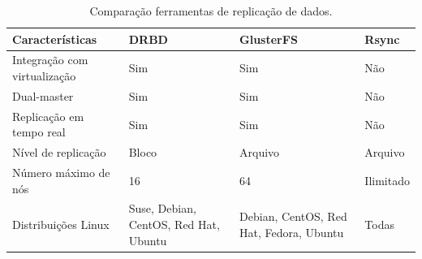 
\begin{table}[h!]
\caption{Comparação ferramentas de replicação de dados.}
\label{tab:replicacao}
\begin{center}
\begin{tabular}{|l|p{3.5cm}|p{3.5cm}|p{2cm}|}\hline
\textbf{Características} & \textbf{DRBD} & \textbf{GlusterFS} & \textbf{Rsync} \\\hline
Integração com virtualização & Sim & Sim & Não \\\hline
Dual-master & Sim & Sim & Não \\\hline
Replicação em tempo real & Sim & Sim & Não \\\hline
Nível de replicação & Bloco & Arquivo & Arquivo \\\hline
Número máximo de nós & 16 & 64 & Ilimitado \\\hline
Distribuições Linux & Suse, Debian, CentOS, Red Hat, Ubuntu & Debian, CentOS, Red Hat, Fedora, Ubuntu & Todas \\\hline
\end{tabular}
\end{center}
\end{table}






